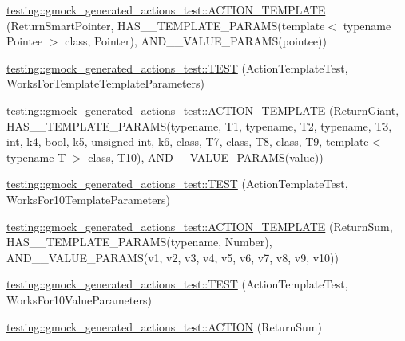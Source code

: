 \begin{DoxyCompactItemize}
\item 
\mbox{\hyperlink{namespacetesting_1_1gmock__generated__actions__test_ad99d926be507eb0c031538da2e8bb838}{testing\+::gmock\+\_\+generated\+\_\+actions\+\_\+test\+::\+A\+C\+T\+I\+O\+N\+\_\+\+T\+E\+M\+P\+L\+A\+TE}} (Return\+Smart\+Pointer, H\+A\+S\+\_\+\_\+\+T\+E\+M\+P\+L\+A\+T\+E\+\_\+\+P\+A\+R\+A\+MS(template$<$ typename Pointee $>$ class, Pointer), A\+N\+D\+\_\+\_\+\+V\+A\+L\+U\+E\+\_\+\+P\+A\+R\+A\+MS(pointee))
\item 
\mbox{\hyperlink{namespacetesting_1_1gmock__generated__actions__test_a8908d6badc9054adebdaf5ed8d455c2d}{testing\+::gmock\+\_\+generated\+\_\+actions\+\_\+test\+::\+T\+E\+ST}} (Action\+Template\+Test, Works\+For\+Template\+Template\+Parameters)
\item 
\mbox{\hyperlink{namespacetesting_1_1gmock__generated__actions__test_aea61dba8f93605f3e8c1cdedfd1079f5}{testing\+::gmock\+\_\+generated\+\_\+actions\+\_\+test\+::\+A\+C\+T\+I\+O\+N\+\_\+\+T\+E\+M\+P\+L\+A\+TE}} (Return\+Giant, H\+A\+S\+\_\+\_\+\+T\+E\+M\+P\+L\+A\+T\+E\+\_\+\+P\+A\+R\+A\+MS(typename, T1, typename, T2, typename, T3, int, k4, bool, k5, unsigned int, k6, class, T7, class, T8, class, T9, template$<$ typename T $>$ class, T10), A\+N\+D\+\_\+\_\+\+V\+A\+L\+U\+E\+\_\+\+P\+A\+R\+A\+MS(\mbox{\hyperlink{_obj__test_2lib_2googletest-master_2googlemock_2test_2gmock-matchers__test_8cc_a337b8a670efc0b086ad3af163f3121b6}{value}}))
\item 
\mbox{\hyperlink{namespacetesting_1_1gmock__generated__actions__test_a39707e50b998b0866ea7dec54099f38f}{testing\+::gmock\+\_\+generated\+\_\+actions\+\_\+test\+::\+T\+E\+ST}} (Action\+Template\+Test, Works\+For10\+Template\+Parameters)
\item 
\mbox{\hyperlink{namespacetesting_1_1gmock__generated__actions__test_a0e21a6c1f43a7125a29e6e1edcd7006c}{testing\+::gmock\+\_\+generated\+\_\+actions\+\_\+test\+::\+A\+C\+T\+I\+O\+N\+\_\+\+T\+E\+M\+P\+L\+A\+TE}} (Return\+Sum, H\+A\+S\+\_\+\_\+\+T\+E\+M\+P\+L\+A\+T\+E\+\_\+\+P\+A\+R\+A\+MS(typename, Number), A\+N\+D\+\_\+\_\+\+V\+A\+L\+U\+E\+\_\+\+P\+A\+R\+A\+MS(v1, v2, v3, v4, v5, v6, v7, v8, v9, v10))
\item 
\mbox{\hyperlink{namespacetesting_1_1gmock__generated__actions__test_aa8dd9ea1777fe67626bab2815b7261f4}{testing\+::gmock\+\_\+generated\+\_\+actions\+\_\+test\+::\+T\+E\+ST}} (Action\+Template\+Test, Works\+For10\+Value\+Parameters)
\item 
\mbox{\hyperlink{namespacetesting_1_1gmock__generated__actions__test_a49c180470c75de1ab88cd2928e738d33}{testing\+::gmock\+\_\+generated\+\_\+actions\+\_\+test\+::\+A\+C\+T\+I\+ON}} (Return\+Sum)

\end{DoxyCompactItemize}
